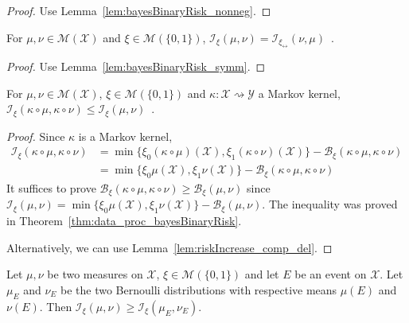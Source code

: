 \begin{proof}\leanok
{}
Use Lemma~\ref{lem:bayesBinaryRisk_nonneg}.
\end{proof}


\begin{lemma}
  \label{lem:statInfo_symm}
  \leanok
  For $\mu, \nu \in \mathcal M(\mathcal X)$ and $\xi \in \mathcal M(\{0,1\})$, $\mathcal I_\xi(\mu, \nu) = \mathcal I_{\xi_\leftrightarrow}(\nu, \mu)$~.
\end{lemma}

\begin{proof}\leanok
{}
Use Lemma~\ref{lem:bayesBinaryRisk_symm}.
\end{proof}

\begin{theorem}
  \label{thm:data_proc_statInfo}
  \leanok
  For $\mu, \nu \in \mathcal M(\mathcal X)$, $\xi \in \mathcal M(\{0,1\})$ and $\kappa : \mathcal X \rightsquigarrow \mathcal Y$ a Markov kernel, $\mathcal I_\xi(\kappa \circ \mu, \kappa \circ \nu) \le \mathcal I_\xi(\mu, \nu)$~.
\end{theorem}

\begin{proof}\leanok
{}
Since $\kappa$ is a Markov kernel,
\begin{align*}
\mathcal I_\xi(\kappa \circ \mu, \kappa \circ \nu)
&= \min\{\xi_0(\kappa \circ \mu)(\mathcal X), \xi_1(\kappa \circ \nu)(\mathcal X)\} - \mathcal B_\xi(\kappa \circ \mu, \kappa \circ \nu)
\\
&= \min\{\xi_0 \mu(\mathcal X), \xi_1 \nu(\mathcal X)\} - \mathcal B_\xi(\kappa \circ \mu, \kappa \circ \nu)
\end{align*}
It suffices to prove $\mathcal B_\xi(\kappa \circ \mu, \kappa \circ \nu) \ge \mathcal B_\xi(\mu, \nu)$ since $\mathcal I_\xi(\mu, \nu) = \min\{\xi_0\mu(\mathcal X), \xi_1\nu(\mathcal X)\} - \mathcal B_\xi(\mu, \nu)$.
The inequality was proved in Theorem~\ref{thm:data_proc_bayesBinaryRisk}.

Alternatively, we can use Lemma~\ref{lem:riskIncrease_comp_del}.
\end{proof}


\begin{corollary}
  \label{cor:statInfo_data_proc_event}
  \leanok
  Let $\mu, \nu$ be two measures on $\mathcal X$, $\xi \in \mathcal M(\{0,1\})$ and let $E$ be an event on $\mathcal X$. Let $\mu_E$ and $\nu_E$ be the two Bernoulli distributions with respective means $\mu(E)$ and $\nu(E)$.
  Then $\mathcal I_\xi(\mu, \nu) \ge \mathcal I_\xi(\mu_E, \nu_E)$.
\end{corollary}

